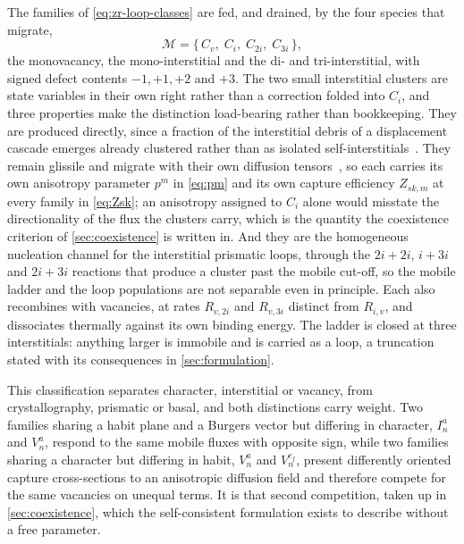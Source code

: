 The families of \cref{eq:zr-loop-classes} are fed, and drained, by the four
species that migrate,
\begin{equation}
  \mathcal M=\{\,C_v,\;C_i,\;C_{2i},\;C_{3i}\,\},
  \label{eq:mobile-classes}
\end{equation}
the monovacancy, the mono-interstitial and the di- and tri-interstitial, with
signed defect contents $-1,+1,+2$ and $+3$. The two small interstitial clusters
are state variables in their own right rather than a correction folded into
$C_i$, and three properties make the distinction load-bearing rather than
bookkeeping. They are produced directly, since a fraction of the interstitial
debris of a displacement cascade emerges already clustered rather than as
isolated
self-interstitials~\citep{voskoboinikov2006identification,Voskoboinikov2008,Bjorkas2009Zr}.
They remain glissile and migrate with their own diffusion
tensors~\citep{de2002mobility,Domain2002,peng2012stability}, so each carries its
own anisotropy parameter $p^{m}$ in \cref{eq:pm} and its own capture efficiency
$Z_{sk,m}$ at every family in \cref{eq:Zsk}; an anisotropy assigned to $C_i$
alone would misstate the directionality of the flux the clusters carry, which is
the quantity the coexistence criterion of \cref{sec:coexistence} is written in.
And they are the homogeneous nucleation channel for the interstitial prismatic
loops, through the $2i+2i$, $i+3i$ and $2i+3i$ reactions that produce a cluster past the
mobile cut-off, so the mobile ladder and the loop populations are not separable
even in principle. Each also recombines with vacancies, at rates $R_{v,2i}$ and
$R_{v,3i}$ distinct from $R_{i,v}$, and dissociates thermally against its own
binding energy. The ladder is closed at three interstitials: anything larger is
immobile and is carried as a loop, a truncation stated with its consequences in
\cref{sec:formulation}.

This classification separates character, interstitial or vacancy, from
crystallography, prismatic or basal, and both distinctions carry weight. Two
families sharing a habit plane and a Burgers vector but differing in character,
$I_n^a$ and $V_n^a$, respond to the same mobile fluxes with opposite sign, while
two families sharing a character but differing in habit, $V_n^a$ and $V_n^{c_f}$,
present differently oriented capture cross-sections to an anisotropic diffusion
field and therefore compete for the same vacancies on unequal terms. It is that
second competition, taken up in \cref{sec:coexistence}, which the self-consistent
formulation exists to describe without a free parameter.

